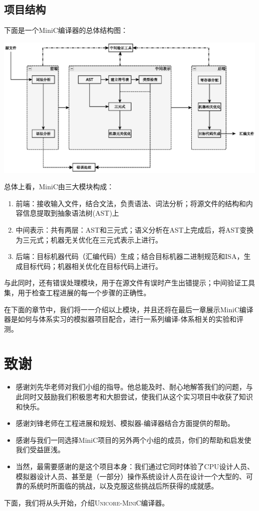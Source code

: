 \subsection*{项目结构}
下面是一个MiniC编译器的总体结构图：
\begin{center}
\includegraphics[scale=0.7]{main_structure.eps}
\end{center}
总体上看，MiniC由三大模块构成：
\begin{enumerate}
\item 前端：接收输入文件，结合文法，负责语法、词法分析；将源文件的结构和内容信息提取到抽象语法树(AST)上
\item 中间表示：共有两层：AST和三元式；语义分析在AST上完成后，将AST变换为三元式；机器无关优化在三元式表示上进行。
\item 后端：目标机器代码（汇编代码）生成；结合目标机器二进制规范和ISA，生成目标代码；机器相关优化在目标代码上进行。
\end{enumerate}
与此同时，还有错误处理模块，用于在源文件有误时产生出错提示；中间验证工具集，用于检查工程进展的每一个步骤的正确性。

在下面的章节中，我们将一一介绍以上模块，并且还将在最后一章展示MiniC编译器是如何与体系实习的模拟器项目配合，进行一系列编译-体系相关的实验和评测。

\section*{致谢}
\begin{itemize}
\item 感谢刘先华老师对我们小组的指导。他总能及时、耐心地解答我们的问题，与此同时又鼓励我们积极思考和大胆尝试，使我们从这个实习项目中收获了知识和快乐。

\item 感谢刘锋老师在工程进展和规划、模拟器-编译器结合方面提供的帮助。

\item 感谢与我们一同选择MiniC项目的另外两个小组的成员，你们的帮助和启发使我们受益匪浅。

\item 当然，最需要感谢的是这个项目本身：我们通过它同时体验了CPU设计人员、模拟器设计人员、甚至是（一部分）操作系统设计人员在设计一个大型的、可靠的系统时所面临的挑战，以及克服这些挑战后所获得的成就感。
\end{itemize}

下面，我们将从头开始，介绍\textsc{Unicore-MiniC}编译器。

